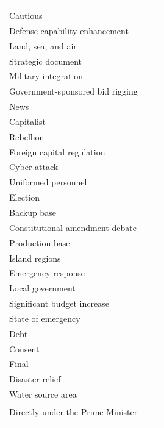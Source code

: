 \documentclass[final,5p,times,twocolumn,authoryear]{elsarticle}
\begin{document}
\begin{table}[htbp]
\begin{tabularx}{\textwidth}{|>{\centering\arraybackslash}X|>{\centering\arraybackslash}X|>{\centering\arraybackslash}X|}
\begin{tabular}[c]{@{}l@{}}
	Diplomatic dialogue \\ Cautious \\ Defense capability enhancement \\ Land, sea, and air \\ Strategic document \\ Military integration \\ Government-sponsored bid rigging \\ News \\ Capitalist \\ Rebellion \\ Foreign capital regulation \\ Cyber attack \\ Uniformed personnel \\ Election \\ Backup base \\ Constitutional amendment debate \\ Production base \\ Island regions \\ Emergency response \\ Local government \\ Significant budget increase \\ State of emergency \\ Debt \\ Consent \\ Final \\ Disaster relief \\ Water source area \\ Directly under the Prime Minister
\end{tabular} 
& 
\begin{tabular}[c]{@{}l@{}}

\end{tabular}
\end{tabularx}
\end{table}
\end{document}
